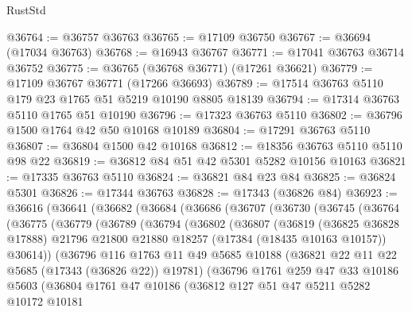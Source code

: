 \begin{lexlean}{RustStd}
\begin{coremodule}
@36764 := @36757 @36763
@36765 := @17109 @36750
@36767 := @36694 (@17034 @36763)
@36768 := @16943 @36767
@36771 := @17041 @36763 @36714 @36752
@36775 := @36765 (@36768 @36771) (@17261 @36621)
@36779 := @17109 @36767 @36771 (@17266 @36693)
@36789 := @17514 @36763 @5110 @179 @23 @1765 @51 @5219 @10190 @8805 @18139
@36794 := @17314 @36763 @5110 @1765 @51 @10190
@36796 := @17323 @36763 @5110
@36802 := @36796 @1500 @1764 @42 @50 @10168 @10189
@36804 := @17291 @36763 @5110
@36807 := @36804 @1500 @42 @10168
@36812 := @18356 @36763 @5110 @5110 @98 @22
@36819 := @36812 @84 @51 @42 @5301 @5282 @10156 @10163
@36821 := @17335 @36763 @5110
@36824 := @36821 @84 @23 @84
@36825 := @36824 @5301
@36826 := @17344 @36763
@36828 := @17343 (@36826 @84)
@36923 := @36616
    (@36641
      (@36682
        (@36684
          (@36686
            (@36707
              (@36730
                (@36745
                  (@36764
                    (@36775
                      (@36779
                        (@36789
                          (@36794
                            (@36802
                              (@36807
                                (@36819
                                  (@36825 @36828 @17888)
                                  @21796
                                  @21800
                                  @21880
                                  @18257
                                  (@17384 (@18435 @10163 @10157))
                                  @30614))
                              (@36796
                                @116
                                @1763
                                @11
                                @49
                                @5685
                                @10188
                                (@36821 @22 @11 @22 @5685 (@17343 (@36826 @22)) @19781)
                                (@36796
                                  @1761
                                  @259
                                  @47
                                  @33
                                  @10186
                                  @5603
                                  (@36804
                                    @1761
                                    @47
                                    @10186
                                    (@36812
                                      @127
                                      @51
                                      @47
                                      @5211
                                      @5282
                                      @10172
                                      @10181

\end{coremodule}
\end{lexlean}
